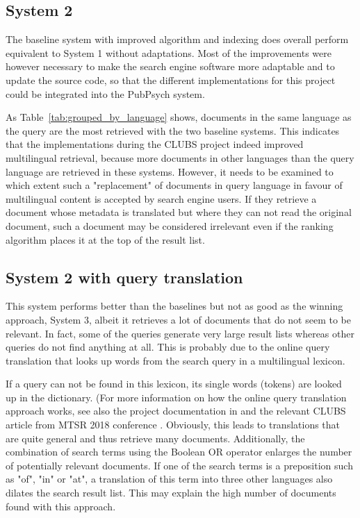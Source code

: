 \documentclass[a4paper,11pt]{article}
\begin{document}
\subsection{System 2}
The baseline system with improved algorithm and indexing does overall perform equivalent to System 1 without adaptations. Most of the improvements were however necessary to make the search engine software more adaptable and to update the source code, so that the different implementations for this project could be integrated into the PubPsych system.

As Table~\ref{tab:grouped_by_language} shows, documents in the same language as the query are the most retrieved with the two baseline systems. This indicates that the implementations during the CLUBS project indeed improved multilingual retrieval, because more documents in other languages than the query language are retrieved in these systems. However, it needs to be examined to which extent such a "replacement" of documents in query language in favour of multilingual content is accepted by search engine users. If they retrieve a document whose metadata is translated but where they can not read the original document, such a document may be considered irrelevant even if the ranking algorithm places it at the top of the result list.

\subsection{System 2 with query translation}
This system performs better than the baselines but not as good as the winning approach, System 3, albeit it retrieves a lot of documents that do not seem to be relevant. In fact, some of the queries generate very large result lists whereas other queries do not find anything at all. This is probably due to the online query translation that looks up words from the search query in a multilingual lexicon. 

If a query can not be found in this lexicon, its single words (tokens) are looked up in the dictionary. (For more information on how the online query translation approach works, see also the project documentation in \cite{m1.5_2018} and the relevant CLUBS article from MTSR 2018 conference \cite{espana_mtsr}. Obviously, this leads to translations that are quite general and thus retrieve many documents. Additionally, the combination of search terms using the Boolean OR operator enlarges the number of potentially relevant documents. If one of the search terms is a preposition such as "of", "in" or "at", a translation of this term into three other languages also dilates the search result list. This may explain the high number of documents found with this approach.
\end{document}
